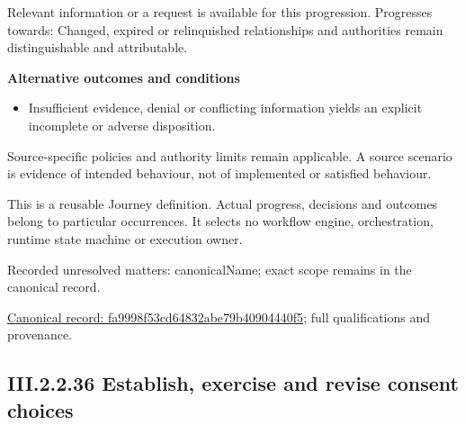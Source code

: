 Relevant information or a request is available for this progression. Progresses towards: Changed, expired or relinquished relationships and authorities remain distinguishable and attributable.



\par\medskip\textbf{Alternative outcomes and conditions}\par


\begin{itemize}


\item Insufficient evidence, denial or conflicting information yields an explicit incomplete or adverse disposition.

\end{itemize}


Source-specific policies and authority limits remain applicable. A source scenario is evidence of intended behaviour, not of implemented or satisfied behaviour.



This is a reusable Journey definition. Actual progress, decisions and outcomes belong to particular occurrences. It selects no workflow engine, orchestration, runtime state machine or execution owner.


{\small Recorded unresolved matters: canonicalName; exact scope remains in the canonical record.}\par
{\footnotesize \href{../../../../../../../continuum/strategy/value-stream/fa9998f53cd64832abe79b40904440f5.md}{Canonical record: fa9998f53cd64832abe79b40904440f5}; full qualifications and provenance.}\par
\subsection*{III.2.2.36 Establish, exercise and revise consent choices}
\label{navigation:III.2.2.36}

